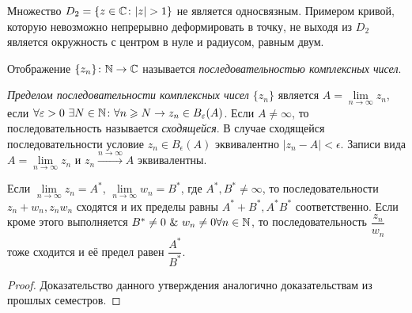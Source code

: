 \begin{example}
\begin{minipage}[c]{0.45\linewidth}
\end{minipage}%
\begin{minipage}[c]{0.52\linewidth}
Множество \(D_2 = \{z \in \mathbb{C} \colon |z| > 1\}\) не является односвязным. Примером кривой, которую
невозможно непрерывно деформировать в точку, не выходя из \(D_2\) является окружность с центром в
нуле и радиусом, равным двум.
\end{minipage}
\end{example}



\begin{definition}
Отображение \(\{z_n\} \colon \mathbb{N} \to \mathbb{C}\) называется \textit{последовательностью комплексных чисел}.
\end{definition}

\begin{definition}
\textit{Пределом последовательности комплексных чисел \(\{z_n\}\)} является \(A = \lim\limits_{n \to
\infty} z_n\), если \(\forall \varepsilon > 0 \ \exists N \in \mathbb{N} \colon \forall n \geqslant N \rightarrow z_n
\in B_\varepsilon(A)\). Если \(A \ne \infty\), то последовательность называется \textit{сходящейся}. В
случае сходящейся последовательности условие \(z_n \in B_\epsilon(A)\) эквивалентно \(|z_n-A| <
\epsilon\). Записи вида \(A = \lim\limits_{n \to \infty} z_n\) и \(z_n \xrightarrow{n \to \infty}
A\) эквивалентны.
\end{definition}

\begin{statement}\label{7:arithmetic_properties}
Если \(\lim\limits_{n \to \infty} z_n = A^*\), \(\lim\limits_{n \to \infty} w_n = B^*\), где \(A^*,
B^* \ne \infty\), то последовательности \(z_n + w_n, z_nw_n\) сходятся и их пределы равны \(A^* +
B^*, A^*B^*\) соответственно. Если кроме этого выполняется \(B^* \ne 0 \ \& \ w_n \ne 0 \forall n
\in \mathbb{N}\), то последовательность \(\dfrac{z_n}{w_n}\) тоже сходится и её предел равен
\(\dfrac{A^*}{B^*}\).
\end{statement}

\begin{proof}
Доказательство данного утверждения аналогично доказательствам из прошлых семестров.
\end{proof}

